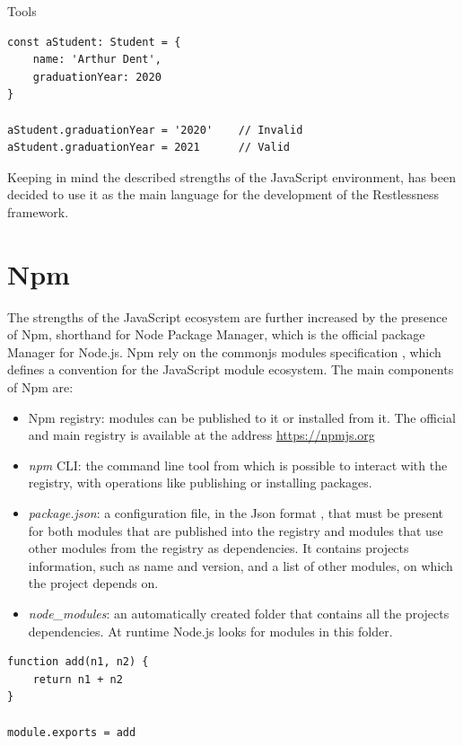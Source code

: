 \begin{chapter}{Tools}
\begin{lstlisting}[caption=Static type checking on Typescript, label={ts_static}]
const aStudent: Student = {
    name: 'Arthur Dent',
    graduationYear: 2020
}

aStudent.graduationYear = '2020'    // Invalid
aStudent.graduationYear = 2021      // Valid
    \end{lstlisting}

    Keeping in mind the described strengths of the JavaScript environment, has been
    decided to use it as the main language for the development of the Restlessness
    framework.

    \section{Npm}
    The strengths of the JavaScript ecosystem are further increased by the presence
    of Npm, shorthand for Node Package Manager, which is the official package Manager
    for Node.js. Npm rely on the commonjs modules specification \cite{common_js},
    which defines a convention for the JavaScript module ecosystem.
    The main components of Npm are:
    \begin{itemize}
        \item Npm registry: modules can be published to it or installed from it.
            The official and main registry is available at the address
            \url{https://npmjs.org}
        \item \textit{npm} CLI: the command line tool from which is possible to interact
            with the registry, with operations like publishing or installing packages.
        \item \textit{package.json}: a configuration file, in the Json format
            \cite{json_iso}, that must be present for both modules that are published
            into the registry and modules that use other modules from the registry
            as dependencies. It contains projects information, such as name and
            version, and a list of other modules, on which the project depends on.
        \item \textit{node\_modules}: an automatically created folder that contains
            all the projects dependencies. At runtime Node.js looks for modules
            in this folder.
    \end{itemize}

    \bigskip
    \begin{lstlisting}[caption=CommonJs module definition]
function add(n1, n2) {
    return n1 + n2
}

module.exports = add
    \end{lstlisting}


\end{chapter}
